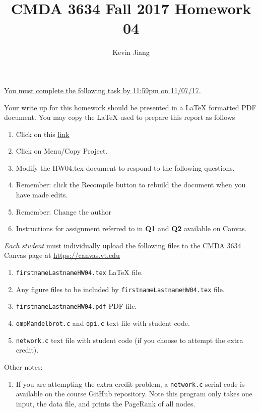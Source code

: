 \documentclass{article}
\newcommand{\pad}{\vspace{8pt}\noindent}
\newcommand{\myhref}[2]{\href{#1}{\color{foo}\underline{#2}\color{black}}}
\begin{document}
\title{CMDA 3634 Fall 2017 Homework 04}

\author{Kevin Jiang}
\vspace{-64pt}\maketitle
\begin{center}\underline{You must complete the following task by 11:59pm on 11/07/17.}\end{center}
Your write up for this homework should be presented in a {\LaTeX} formatted PDF document. You may copy the \LaTeX{} used to prepare this report as follows

\begin{enumerate}
\item Click on this  \myhref{https://www.sharelatex.com/project/59ee4adaf41d5451ffb9844c}{link} 
\item Click on Menu/Copy Project.
\item Modify the HW04.tex document to respond to the following questions. 
\item Remember: click the Recompile button to rebuild the document when you have made edits.
\item Remember: Change the author 
\item Instructions for assignment referred to in {\bf Q1} and {\bf Q2} available on Canvas.
\end{enumerate}

\pad \emph{Each student} must individually upload the following files to the CMDA 3634 Canvas page at \myhref{https://canvas.vt.edu}{https://canvas.vt.edu}

\begin{enumerate}
\item \verb|firstnameLastnameHW04.tex| {\LaTeX} file.
\item Any figure files to be included by \verb|firstnameLastnameHW04.tex| file.
\item \verb|firstnameLastnameHW04.pdf| PDF file.
\item \verb|ompMandelbrot.c| and \verb|opi.c| text file with student code. 
\item \verb|network.c| text file with student code (if you choose to attempt the extra credit).
\end{enumerate}



\pad Other notes:
\begin{enumerate}
    \item If you are attempting the extra credit problem, a \verb|network.c| serial code is available on the course GitHub repository. Note this program only takes one input, the data file, and prints the PageRank of all nodes.
\end{enumerate}
\end{document}
